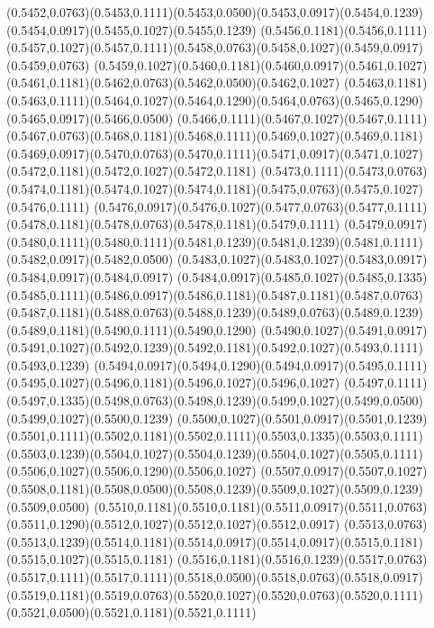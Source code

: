 (0.5452,0.0763)(0.5453,0.1111)(0.5453,0.0500)(0.5453,0.0917)(0.5454,0.1239)(0.5454,0.0917)(0.5455,0.1027)(0.5455,0.1239)
(0.5456,0.1181)(0.5456,0.1111)(0.5457,0.1027)(0.5457,0.1111)(0.5458,0.0763)(0.5458,0.1027)(0.5459,0.0917)(0.5459,0.0763)
(0.5459,0.1027)(0.5460,0.1181)(0.5460,0.0917)(0.5461,0.1027)(0.5461,0.1181)(0.5462,0.0763)(0.5462,0.0500)(0.5462,0.1027)
(0.5463,0.1181)(0.5463,0.1111)(0.5464,0.1027)(0.5464,0.1290)(0.5464,0.0763)(0.5465,0.1290)(0.5465,0.0917)(0.5466,0.0500)
(0.5466,0.1111)(0.5467,0.1027)(0.5467,0.1111)(0.5467,0.0763)(0.5468,0.1181)(0.5468,0.1111)(0.5469,0.1027)(0.5469,0.1181)
(0.5469,0.0917)(0.5470,0.0763)(0.5470,0.1111)(0.5471,0.0917)(0.5471,0.1027)(0.5472,0.1181)(0.5472,0.1027)(0.5472,0.1181)
(0.5473,0.1111)(0.5473,0.0763)(0.5474,0.1181)(0.5474,0.1027)(0.5474,0.1181)(0.5475,0.0763)(0.5475,0.1027)(0.5476,0.1111)
(0.5476,0.0917)(0.5476,0.1027)(0.5477,0.0763)(0.5477,0.1111)(0.5478,0.1181)(0.5478,0.0763)(0.5478,0.1181)(0.5479,0.1111)
(0.5479,0.0917)(0.5480,0.1111)(0.5480,0.1111)(0.5481,0.1239)(0.5481,0.1239)(0.5481,0.1111)(0.5482,0.0917)(0.5482,0.0500)
(0.5483,0.1027)(0.5483,0.1027)(0.5483,0.0917)(0.5484,0.0917)(0.5484,0.0917)
\PST@Solid(0.5484,0.0917)(0.5485,0.1027)(0.5485,0.1335)(0.5485,0.1111)(0.5486,0.0917)(0.5486,0.1181)(0.5487,0.1181)(0.5487,0.0763)
(0.5487,0.1181)(0.5488,0.0763)(0.5488,0.1239)(0.5489,0.0763)(0.5489,0.1239)(0.5489,0.1181)(0.5490,0.1111)(0.5490,0.1290)
(0.5490,0.1027)(0.5491,0.0917)(0.5491,0.1027)(0.5492,0.1239)(0.5492,0.1181)(0.5492,0.1027)(0.5493,0.1111)(0.5493,0.1239)
(0.5494,0.0917)(0.5494,0.1290)(0.5494,0.0917)(0.5495,0.1111)(0.5495,0.1027)(0.5496,0.1181)(0.5496,0.1027)(0.5496,0.1027)
(0.5497,0.1111)(0.5497,0.1335)(0.5498,0.0763)(0.5498,0.1239)(0.5499,0.1027)(0.5499,0.0500)(0.5499,0.1027)(0.5500,0.1239)
(0.5500,0.1027)(0.5501,0.0917)(0.5501,0.1239)(0.5501,0.1111)(0.5502,0.1181)(0.5502,0.1111)(0.5503,0.1335)(0.5503,0.1111)
(0.5503,0.1239)(0.5504,0.1027)(0.5504,0.1239)(0.5504,0.1027)(0.5505,0.1111)(0.5506,0.1027)(0.5506,0.1290)(0.5506,0.1027)
(0.5507,0.0917)(0.5507,0.1027)(0.5508,0.1181)(0.5508,0.0500)(0.5508,0.1239)(0.5509,0.1027)(0.5509,0.1239)(0.5509,0.0500)
(0.5510,0.1181)(0.5510,0.1181)(0.5511,0.0917)(0.5511,0.0763)(0.5511,0.1290)(0.5512,0.1027)(0.5512,0.1027)(0.5512,0.0917)
(0.5513,0.0763)(0.5513,0.1239)(0.5514,0.1181)(0.5514,0.0917)(0.5514,0.0917)(0.5515,0.1181)(0.5515,0.1027)(0.5515,0.1181)
(0.5516,0.1181)(0.5516,0.1239)(0.5517,0.0763)(0.5517,0.1111)(0.5517,0.1111)(0.5518,0.0500)(0.5518,0.0763)(0.5518,0.0917)
(0.5519,0.1181)(0.5519,0.0763)(0.5520,0.1027)(0.5520,0.0763)(0.5520,0.1111)(0.5521,0.0500)(0.5521,0.1181)(0.5521,0.1111)
